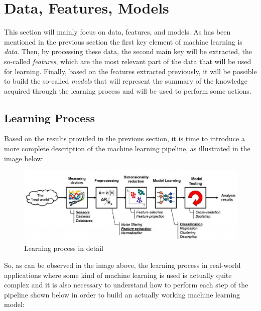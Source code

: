 \section{Data, Features, Models}
This section will mainly focus on data, features, and models.
As has been mentioned in the previous section the first key element
of machine learning is \emph{data}. Then, by processing these data,
the second main key will be extracted, the so-called \emph{features},
which are the most relevant part of the data that will be used for
learning. Finally, based on the features extracted previously, it will
be possible to build the so-called \emph{models} that will represent the
summary of the knowledge acquired through the learning process and will
be used to perform some actions.

\subsection{Learning Process}

Based on the results provided in the previous section, it is time to
introduce a more complete description of the machine learning pipeline,
as illustrated in the image below:

\vspace{5mm}

\begin{figure}[h]
      \centering
      \includegraphics[width=\textwidth]{../img/Learning_process}
      \caption{Learning process in detail}
\end{figure}

\newpage

So, as can be observed in the image above, the learning process
in real-world applications where some kind of machine learning is
used is actually quite complex and it is also necessary to understand
how to perform each step of the pipeline shown below in order to build
an actually working machine learning model:

